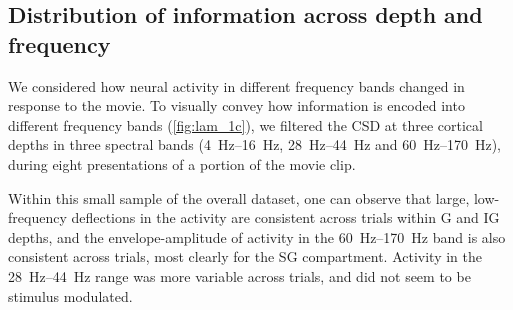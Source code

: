 \subsection{Distribution of information across depth and frequency}

We considered how neural activity in different frequency bands changed in response to the movie.
To visually convey how information is encoded into different frequency bands (\autoref{fig:lam_1c}), we filtered the \ac{CSD} at three cortical depths in three spectral bands (\SIrange{4}{16}{Hz}, \SIrange{28}{44}{Hz} and \SIrange{60}{170}{Hz}), during eight presentations of a portion of the movie clip.

Within this small sample of the overall dataset, one can observe that large, low-frequency deflections in the activity are consistent across trials within \ac{G} and \ac{IG} depths, and the envelope-amplitude of activity in the \SIrange{60}{170}{Hz} band is also consistent across trials, most clearly for the \ac{SG} compartment.
Activity in the \SIrange{28}{44}{Hz} range was more variable across trials, and did not seem to be stimulus modulated.


